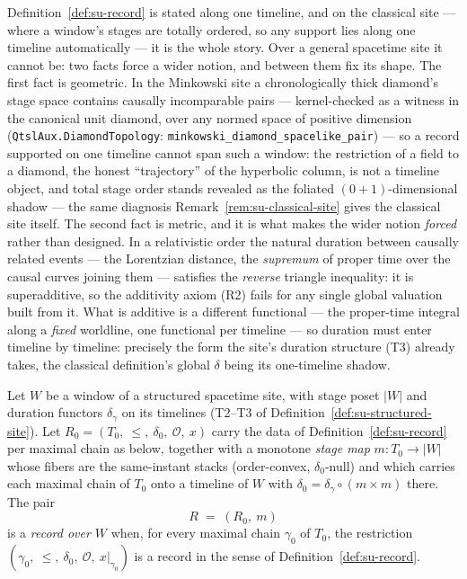 Definition~\ref{def:su-record} is stated along one timeline, and on
the classical site --- where a window's stages are totally ordered,
so any support lies along one timeline automatically --- it is the
whole story. Over a general spacetime site it cannot be: two facts
force a wider notion, and between them fix its shape. The first fact
is geometric. In the Minkowski site a chronologically thick
diamond's stage space contains causally incomparable pairs ---
kernel-checked as a witness in the canonical unit diamond, over any
normed space of positive dimension
(\texttt{QtslAux.DiamondTopology}:
\texttt{minkowski\_diamond\_spacelike\_pair}) --- so a record
supported on one timeline cannot span such a window: the restriction of
a field to a diamond, the honest ``trajectory'' of the hyperbolic
column, is not a timeline object, and total stage order stands
revealed as the foliated $(0{+}1)$-dimensional shadow --- the same
diagnosis Remark~\ref{rem:su-classical-site} gives the classical
site itself. The second fact is metric, and it is what makes the
wider notion \emph{forced} rather than designed. In a relativistic
order the natural duration between causally related events --- the
Lorentzian distance, the \emph{supremum} of proper time over the
causal curves joining them --- satisfies the
\emph{reverse} triangle inequality: it is superadditive, so the
additivity axiom (R2) fails for any single global valuation built
from it. What is additive is a different functional --- the
proper-time integral along a \emph{fixed} worldline, one functional
per timeline --- so
duration must enter timeline by
timeline: precisely the form the site's duration
structure (T3) already takes, the classical definition's global
$\delta$ being its one-timeline shadow.

\begin{definition}\label{def:su-record-window}
Let $W$ be a window of a structured spacetime site, with stage poset
$|W|$ and duration functors $\delta_\gamma$ on its timelines
(T2--T3 of Definition~\ref{def:su-structured-site}). Let
$R_0 = (T_0,\ \le,\ \delta_0,\ \mathcal{O},\ x)$ carry the data of
Definition~\ref{def:su-record} per maximal chain as below, together
with a monotone \emph{stage map} $m \colon T_0 \to |W|$ whose fibers
are the same-instant stacks (order-convex, $\delta_0$-null) and
which carries each maximal chain of $T_0$ onto a timeline of $W$
with $\delta_0 = \delta_\gamma \circ (m \times m)$ there. The pair
\[
  R \;=\; (R_0,\ m)
\]
is a \emph{record over $W$} when, for every maximal chain $\gamma_0$
of $T_0$, the restriction
$(\gamma_0,\ \le,\ \delta_0,\ \mathcal{O},\ x|_{\gamma_0})$
is a record in the sense of Definition~\ref{def:su-record}.
\end{definition}


